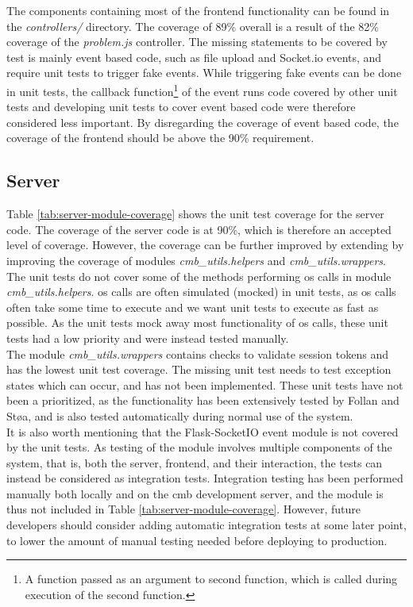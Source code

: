 The components containing most of the frontend functionality can be found in the \textit{controllers/} directory. The coverage of 89\% overall is a result of the 82\% coverage of the \textit{problem.js} controller. The missing statements to be covered by test is mainly event based code, such as file upload and Socket.io events, and require unit tests to trigger fake events. While triggering fake events can be done in unit tests, the callback function\footnote{A function passed as an argument to second function, which is called during execution of the second function.} of the event runs code covered by other unit tests and developing unit tests to cover event based code were therefore considered less important. By disregarding the coverage of event based code, the coverage of the frontend should be above the 90\% requirement.


\subsection{Server}
Table \ref{tab:server-module-coverage} shows the unit test coverage for the server code. The coverage of the server code is at 90\%, which is therefore an accepted level of coverage. However, the coverage can be further improved by extending by improving the coverage of modules \textit{cmb\_utils.helpers} and \textit{cmb\_utils.wrappers}. \\

The unit tests do not cover some of the methods performing \gls{os} calls in module \textit{cmb\_utils.helpers}. \gls{os} calls are often simulated (mocked) in unit tests, as \gls{os} calls often take some time to execute and we want unit tests to execute as fast as possible. As the unit tests mock away most functionality of \gls{os} calls, these unit tests had a low priority and were instead tested manually. \\

The module \textit{cmb\_utils.wrappers} contains checks to validate session tokens and has the lowest unit test coverage. The missing unit test needs to test exception states which can occur, and has not been implemented. These unit tests have not been a prioritized, as the functionality has been extensively tested by Follan and Støa, and is also tested automatically during normal use of the system. \\

It is also worth mentioning that the Flask-SocketIO event module is not covered by the unit tests. As testing of the module involves multiple components of the system, that is, both the server, frontend, and their interaction, the tests can instead be considered as integration tests. Integration testing has been performed manually both locally and on the \gls{cmb} development server, and the module is thus not included in Table \ref{tab:server-module-coverage}. However, future developers should consider adding automatic integration tests at some later point, to lower the amount of manual testing needed before deploying to production.

